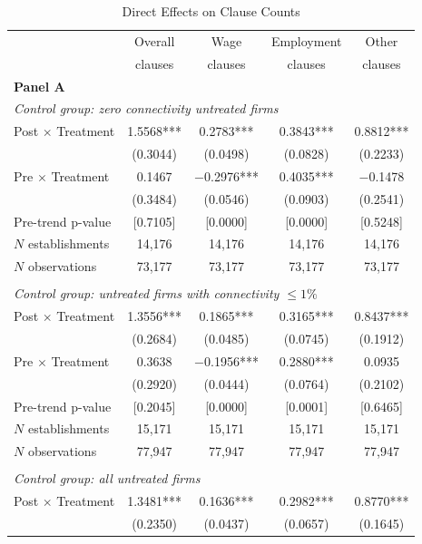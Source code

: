 \begin{table}[!htbp]
\centering
\caption{Direct Effects on Clause Counts}
\label{tab:clause_count_direct}
\scriptsize
\begin{tabular}{lcccc}
\toprule
 & Overall & Wage & Employment & Other \\
 & clauses & clauses & clauses & clauses \\
\midrule
\multicolumn{5}{l}{\textbf{Panel A}}\\
\multicolumn{5}{l}{\textit{Control group: zero connectivity untreated firms}}\\
Post $\times$ Treatment & 1.5568*** & 0.2783*** & 0.3843*** & 0.8812***\\
 & (0.3044) & (0.0498) & (0.0828) & (0.2233)\\
Pre $\times$ Treatment & 0.1467 & $-$0.2976*** & 0.4035*** & $-$0.1478\\
 & (0.3484) & (0.0546) & (0.0903) & (0.2541)\\
Pre-trend p-value & [0.7105] & [0.0000] & [0.0000] & [0.5248]\\
$N$ establishments & 14{,}176 & 14{,}176 & 14{,}176 & 14{,}176\\
$N$ observations & 73{,}177 & 73{,}177 & 73{,}177 & 73{,}177\\
\addlinespace
\multicolumn{5}{l}{\textbf{Panel B}}\\
\multicolumn{5}{l}{\textit{Control group: untreated firms with connectivity $\leq 1\%$}}\\
Post $\times$ Treatment & 1.3556*** & 0.1865*** & 0.3165*** & 0.8437***\\
 & (0.2684) & (0.0485) & (0.0745) & (0.1912)\\
Pre $\times$ Treatment & 0.3638 & $-$0.1956*** & 0.2880*** & 0.0935\\
 & (0.2920) & (0.0444) & (0.0764) & (0.2102)\\
Pre-trend p-value & [0.2045] & [0.0000] & [0.0001] & [0.6465]\\
$N$ establishments & 15{,}171 & 15{,}171 & 15{,}171 & 15{,}171\\
$N$ observations & 77{,}947 & 77{,}947 & 77{,}947 & 77{,}947\\
\addlinespace
\multicolumn{5}{l}{\textbf{Panel C}}\\
\multicolumn{5}{l}{\textit{Control group: all untreated firms}}\\
Post $\times$ Treatment & 1.3481*** & 0.1636*** & 0.2982*** & 0.8770***\\
 & (0.2350) & (0.0437) & (0.0657) & (0.1645)\\

\end{tabular}
\end{table}
